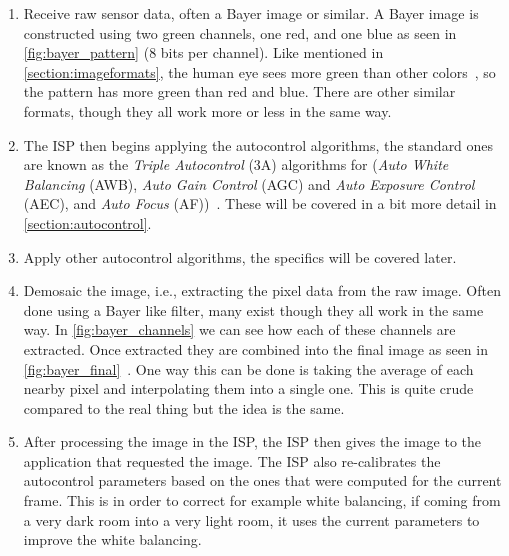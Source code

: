 \begin{enumerate}
    \item Receive raw sensor data, often a Bayer image or similar. A Bayer
        image is constructed using two green channels, one red, and one blue as
        seen in \cref{fig:bayer_pattern} (8 bits per channel). Like mentioned
        in \cref{section:imageformats}, the human eye sees more green than
        other colors~\cite{davson2010human}, so the pattern has more green than
        red and blue. There are other similar formats, though they all work
        more or less in the same way.

    \item The ISP then begins applying the autocontrol algorithms, the standard
        ones are known as the \textit{Triple Autocontrol} (3A) algorithms for
        (\textit{Auto White Balancing} (AWB), \textit{Auto Gain Control} (AGC)
        and \textit{Auto Exposure Control} (AEC), and \textit{Auto Focus}
        (AF))~\cite{libcameraStack}. These will be covered in a bit more detail
        in \cref{section:autocontrol}.

    \item Apply other autocontrol algorithms, the specifics will be covered later.

    \item Demosaic the image, i.e., extracting the pixel data from the raw
        image. Often done using a Bayer like filter, many exist though
        they all work in the same way. In \cref{fig:bayer_channels} we can see
        how each of these channels are extracted. Once extracted they are
        combined into the final image as seen in \cref{fig:bayer_final}~\cite{li2008image, libcameraStack}. One
        way this can be done is taking the average of each nearby pixel and
        interpolating them into a single one. This is quite crude compared to
        the real thing but the idea is the same.

    \item After processing the image in the ISP, the ISP then gives the image
        to the application that requested the image. The ISP also re-calibrates
        the autocontrol parameters based on the ones that were computed for the
        current frame. This is in order to correct for example white balancing,
        if coming from a very dark room into a very light room, it uses the
        current parameters to improve the white balancing.

\end{enumerate}


